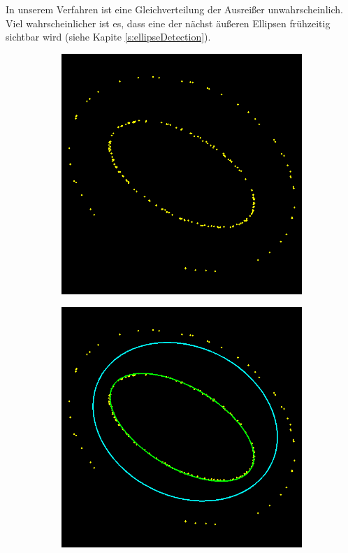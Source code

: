 In unserem Verfahren ist eine Gleichverteilung der Ausreißer unwahrscheinlich. Viel wahrscheinlicher ist es, dass eine der nächst äußeren Ellipsen frühzeitig sichtbar wird (siehe Kapite \ref{s:ellipseDetection}). 

\begin{figure}[!htb]
	\begin{subfigure}{.5\textwidth}
		\centering
		\includegraphics[width=.9\textwidth]{images/ransacShadow25_0.png}
	\end{subfigure}%
	\begin{subfigure}{.5\textwidth}
		\centering
		\includegraphics[width=.9\textwidth]{images/ransacShadow25_1.png}

\end{subfigure}
\end{figure}
